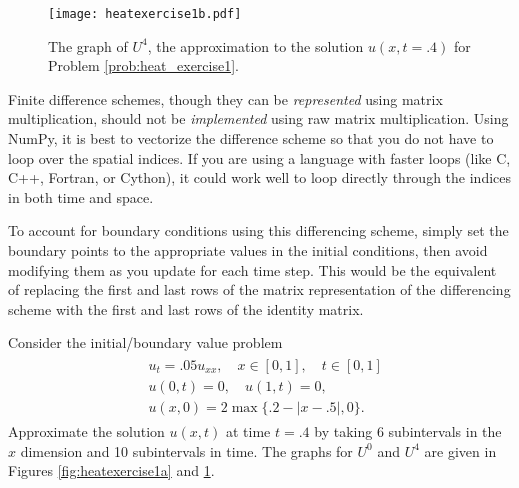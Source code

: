 \begin{figure}
\centering
\texttt{[image: heatexercise1b.pdf]}
\caption{The graph of $U^{4}$, the approximation to the solution $u(x,t=.4)$ for Problem \ref{prob:heat_exercise1}.}
\label{fig:heatexercise1b}
\end{figure}

\begin{info}
Finite difference schemes, though they can be \emph{represented} using matrix multiplication, should not be \emph{implemented} using raw matrix multiplication.
Using NumPy, it is best to vectorize the difference scheme so that you do not have to loop over the spatial indices.
If you are using a language with faster loops (like C, C++, Fortran, or Cython), it could work well to loop directly through the indices in both time and space.
\end{info}

To account for boundary conditions using this differencing scheme, simply set the boundary points to the appropriate values in the initial conditions, then avoid modifying them as you update for each time step.
This would be the equivalent of replacing the first and last rows of the matrix representation of the differencing scheme with the first and last rows of the identity matrix.

\begin{problem}
\label{prob:heat_exercise1}
Consider the initial/boundary value problem
\begin{align}
	\begin{split}
	&{ } u_t = .05 u_{xx}, \quad x \in [0,1], \quad t \in [0,1]\\
	&{ } u(0,t) = 0,\quad u(1,t) = 0,\\
	&{ } u(x,0) = 2\max\{.2 - |x-.5|,0\}.
	\end{split}
\end{align}
Approximate the solution $u(x,t)$ at time $t = .4$ by taking 6 subintervals in the $x$ dimension and 10 subintervals in time.
The graphs for $U^0$ and $U^{4}$ are given in Figures \ref{fig:heatexercise1a} and \ref{fig:heatexercise1b}.
\end{problem}

